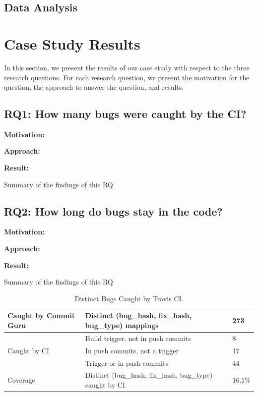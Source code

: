 \documentclass[10pt,conference]{IEEEtran}
\newcommand{\conclusion}[1]{\begin{center}\begin{tcolorbox}[skin=widget, left=0.5mm,right=0.5mm,top=0.5mm,bottom=0.5mm,boxrule=0.3mm,arc=0mm,coltitle=black,colframe=black!99!white,colback=white!88!gray,width=(\linewidth),before=\hfill,after=\hfill]#1\end{tcolorbox}\end{center}}
\newcommand{\rqi}{RQ1:  How many bugs were caught by the CI?}
\newcommand{\rqii}{RQ2: How long do bugs stay in the code?}
\begin{document}
\subsection{Data Analysis}

\section{Case Study Results}
In this section, we present the results of our case study with respect to the three research questions. For each research question, we present the motivation for the question, the approach to answer the question, and results.

\subsection*{\rqi}

\noindent\textbf{Motivation:}

\noindent\textbf{Approach:}

\noindent\textbf{Result:}

\conclusion{Summary of the findings of this RQ}

\subsection*{\rqii}

\noindent\textbf{Motivation:}


\noindent\textbf{Approach:}


\noindent\textbf{Result:}

\conclusion{Summary of the findings of this RQ}


\begin{table}[t]
\centering
\begin{tabular}{lll}
\hline
Caught by Commit Guru         & Distinct (bug\_hash, fix\_hash, bug\_type) mappings     & 273    \\ \hline
\multirow{3}{*}{Caught by CI} & Build trigger, not in push commits                    & 8      \\
                              & In push commits, not a trigger                        & 17     \\
                              & Trigger or in push commits                            & 44     \\ \hline
Coverage                      & Distinct (bug\_hash, fix\_hash, bug\_type) caught by CI & 16.1\% \\ \hline
\end{tabular}
\caption{Distinct Bugs Caught by Travis CI.}
\label{tab:caughtbytravis}
\end{table}
\end{document}
